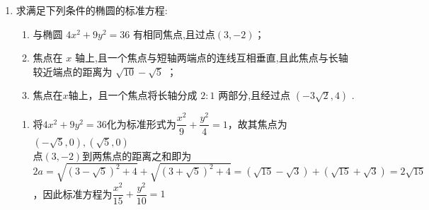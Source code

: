 \begin{enumerate}
\begin{enumerate}
\begin{jieda}
\begin{enumerate}
                \item 根据椭圆的定义有$2a = \sqrt{\dfrac{1}{4}+\dfrac{9}{4}} + \sqrt{\dfrac{81}{4}+\dfrac{9}{4}} = 2\sqrt{10}$，因此$a^2 = 10, b^2 = 6$，故标准方程为$\dfrac{x^2}{10} + \dfrac{y^2}{6} = 1$
                \item 
            \end{enumerate}
        \end{jieda}
        \item 求满足下列条件的椭圆的标准方程:
        \begin{enumerate}
            \item 与椭圆 $4{x}^{2} + 9{y}^{2} = {36}$ 有相同焦点,且过点$(3, - 2)$；
            \item 焦点在 $x$ 轴上,且一个焦点与短轴两端点的连线互相垂直,且此焦点与长轴较近端点的距离为 $\sqrt{10} - \sqrt{5}$ ；
            \item 焦点在$x$轴上，且一个焦点将长轴分成 $2 : 1$ 两部分,且经过点 $\left( {-3\sqrt{2},4}\right)$ .
        \end{enumerate}
        \begin{jieda}
            \begin{enumerate}
                \item 将$4{x}^{2} + 9{y}^{2} = {36}$化为标准形式为$\dfrac{x^2}{9}+\dfrac{y^2}{4} = 1$，故其焦点为$(-\sqrt{5}, 0), (\sqrt{5}, 0)$\\
                点$(3, -2)$到两焦点的距离之和即为$2a = \sqrt{(3-\sqrt{5})^2+4}+\sqrt{(3+\sqrt{5})^2+4} = (\sqrt{15}-\sqrt{3}) + (\sqrt{15}+\sqrt{3}) = 2\sqrt{15}$，因此标准方程为$\dfrac{x^2}{15}+\dfrac{y^2}{10} = 1$

\end{enumerate}
\end{jieda}
\end{enumerate}
\end{enumerate}
